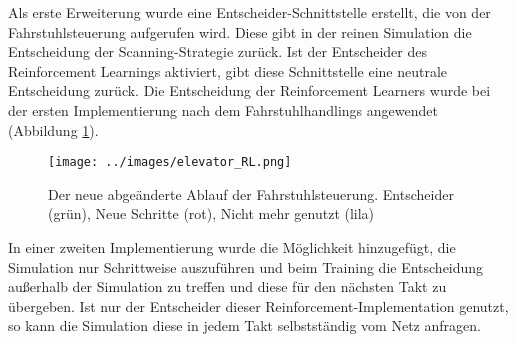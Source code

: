 \documentclass[envcountsame, envcountchap, deutsch]{i-studis}
\begin{document}
Als erste Erweiterung wurde eine Entscheider-Schnittstelle erstellt, die
von der Fahrstuhlsteuerung aufgerufen wird. Diese gibt in der reinen
Simulation die Entscheidung der Scanning-Strategie zurück. Ist der
Entscheider des Reinforcement Learnings aktiviert, gibt diese
Schnittstelle eine neutrale Entscheidung zurück. Die Entscheidung der
Reinforcement Learners wurde bei der ersten Implementierung nach dem
Fahrstuhlhandlings angewendet (Abbildung \ref{elevator_RL}).

\begin{figure}
\centering
\texttt{[image: ../images/elevator\_RL.png]}
\caption{Der neue abgeänderte Ablauf der Fahrstuhlsteuerung. Entscheider
(grün), Neue Schritte (rot), Nicht mehr genutzt (lila)
\label{elevator_RL}}
\end{figure}

In einer zweiten Implementierung wurde die Möglichkeit hinzugefügt, die
Simulation nur Schrittweise auszuführen und beim Training die
Entscheidung außerhalb der Simulation zu treffen und diese für den
nächsten Takt zu übergeben. Ist nur der Entscheider dieser
Reinforcement-Implementation genutzt, so kann die Simulation diese in
jedem Takt selbstständig vom Netz anfragen.




\end{document}
